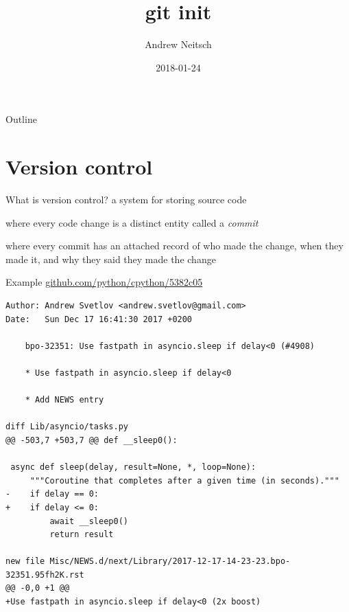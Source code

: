 \documentclass[xcolor=svgnames,17pt]{beamer}
\title{git init}
\author{\texorpdfstring{%
    Andrew Neitsch}{Andrew Neitsch}}
\date{\small 2018-01-24}
\newcommand*{\sizefont}[1]{%
    \ifcase#1\relax
    \or \tiny
    \or \scriptsize
    \or \footnotesize
    \or \small
    \or \normalsize
    \or \large
    \or \Large
    \or \LARGE
    \or \huge
    \or \Huge
    \fi}
\newcommand*{\tocsection}[1]{\pdfbookmark[2]{#1}{#1}}
\begin{document}
\tocsection{Title page}

\sizefont{4}

\begin{frame}[plain]
\titlepage
\end{frame}

\begin{frame}{Outline}
\tableofcontents
\end{frame}

\section{Version control}

\def\fillinblank{\_\_\_\_}

\begin{frame}{What is version control?}
a system for storing source code
\\[\baselineskip] \pause

where every code change is a distinct entity called a \textit{commit}
\\[\baselineskip] \pause

where every commit has an attached record of who made the change, when they
made it, and why they said they made the change
\end{frame}

\begin{frame}[fragile]{Example}
\href{https://github.com/python/cpython/commit/5382c05021026fe623def829d121f5f6af4909fb}{github.com/python/cpython/5382c05}

\sizefont{1}
\begin{verbatim}
Author: Andrew Svetlov <andrew.svetlov@gmail.com>
Date:   Sun Dec 17 16:41:30 2017 +0200

    bpo-32351: Use fastpath in asyncio.sleep if delay<0 (#4908)
    
    * Use fastpath in asyncio.sleep if delay<0
    
    * Add NEWS entry

diff Lib/asyncio/tasks.py
@@ -503,7 +503,7 @@ def __sleep0():
 
 async def sleep(delay, result=None, *, loop=None):
     """Coroutine that completes after a given time (in seconds)."""
-    if delay == 0:
+    if delay <= 0:
         await __sleep0()
         return result
 
new file Misc/NEWS.d/next/Library/2017-12-17-14-23-23.bpo-32351.95fh2K.rst
@@ -0,0 +1 @@
+Use fastpath in asyncio.sleep if delay<0 (2x boost)

\end{verbatim}
\end{frame}
\end{document}
